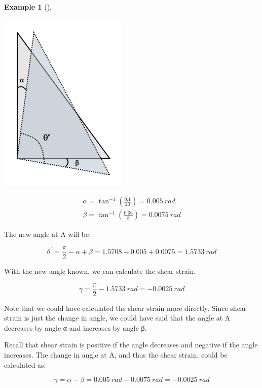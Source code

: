 \documentclass[
  letterpaper,
  DIV=11,
  numbers=noendperiod]{scrreprt}
\theoremstyle{definition}
\newtheorem{example}{Example}[chapter]
\theoremstyle{remark}
\begin{document}
\begin{tcolorbox}
\begin{example}[]
\begin{tcolorbox}
\begin{center}
\includegraphics[width=2.40625in,height=\textheight]{images/CH3 PNGs/example 3.4 part 2.png}
\end{center}

\[
\begin{gathered}
\alpha=\tan ^{-1}\left(\frac{0.1}{20}\right)=0.005{~rad} \\
\beta=\tan ^{-1}\left(\frac{0.06}{8}\right)=0.0075{~rad}
\end{gathered}
\]

The new angle at A will be:

\[
\theta^{\prime}=\frac{\pi}{2}-\alpha+\beta=1.5708-0.005+0.0075=1.5733{~rad}
\]

With the new angle known, we can calculate the shear strain.

\[
\gamma=\frac{\pi}{2}-1.5733{~rad}=-0.0025{~rad}
\]

Note that we could have calculated the shear strain more directly. Since
shear strain is just the change in angle, we could have said that the
angle at A decreases by angle α and increases by angle β.

Recall that shear strain is positive if the angle decreases and negative
if the angle increases. The change in angle at A, and thus the shear
strain, could be calculated as:

\[
\gamma=\alpha-\beta=0.005{~rad}-0.0075{~rad}=-0.0025{~rad}
\]

\end{tcolorbox}

\end{example}

\end{tcolorbox}
\end{document}
